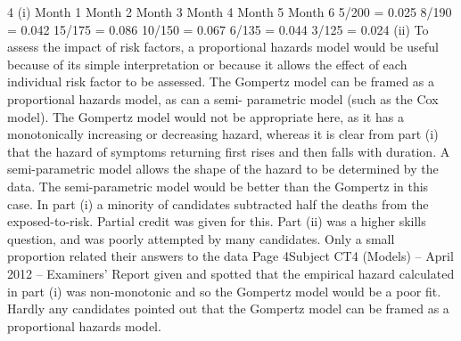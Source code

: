 4
(i) Month 1
Month 2
Month 3
Month 4
Month 5
Month 6
5/200 = 0.025
8/190 = 0.042
15/175 = 0.086
10/150 = 0.067
6/135 = 0.044
3/125 = 0.024
(ii) To assess the impact of risk factors, a proportional hazards model would be useful
because of its simple interpretation or because it allows the effect of each individual
risk factor to be assessed.
The Gompertz model can be framed as a proportional hazards model, as can a semi-
parametric model (such as the Cox model).
The Gompertz model would not be appropriate here, as it has a monotonically
increasing or decreasing hazard,
whereas it is clear from part (i) that the hazard of symptoms returning first rises and
then falls with duration.
A semi-parametric model allows the shape of the hazard to be determined by the data.
The semi-parametric model would be better than the Gompertz in this case.
In part (i) a minority of candidates subtracted half the deaths from the exposed-to-risk.
Partial credit was given for this. Part (ii) was a higher skills question, and was poorly
attempted by many candidates. Only a small proportion related their answers to the data
Page 4Subject CT4 (Models) – April 2012 – Examiners’ Report
given and spotted that the empirical hazard calculated in part (i) was non-monotonic and so
the Gompertz model would be a poor fit. Hardly any candidates pointed out that the
Gompertz model can be framed as a proportional hazards model.
